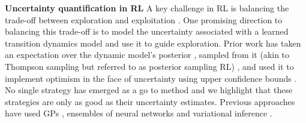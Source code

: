 \documentclass{article}
\begin{document}
\textbf{Uncertainty quantification in RL}
A key challenge in RL is balancing the trade-off between exploration and exploitation \cite{sutton2018reinforcement}.
One promising direction to balancing this trade-off is to model the uncertainty associated with a learned transition dynamics model and use it to guide exploration.
Prior work has taken an expectation over the dynamic model's posterior \cite{deisenroth2011pilco,kamtheDataEfficient2018,chuaDeepReinforcementLearning2018},
sampled from it (akin to Thompson sampling but referred to as posterior sampling RL)
\cite{osbandMoreEfficientReinforcement2013},
and used it to implement optimism in the face of uncertainty using upper confidence bounds \cite{curiEfficient2020}.
No single strategy has emerged as a go to method and we highlight that these strategies are only as good as their uncertainty estimates.
Previous approaches have used GPs \cite{deisenroth2011pilco,kamtheDataEfficient2018},
ensembles of neural networks \cite{curiEfficient2020,chuaDeepReinforcementLearning2018}
and variational inference \cite{galImproving2016,houthooftVIME2017}.






\end{document}
